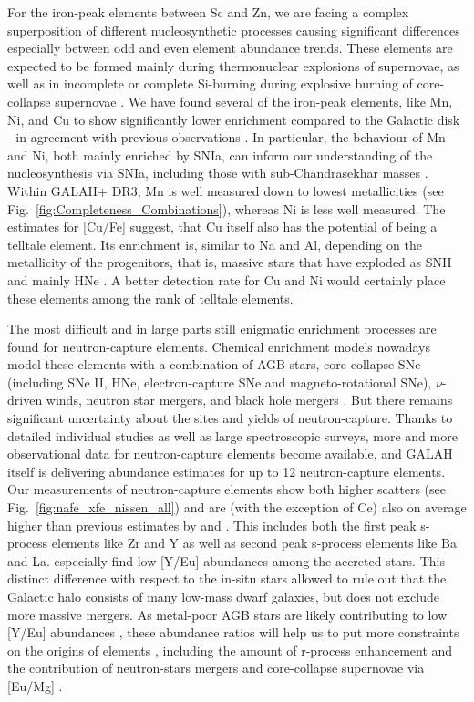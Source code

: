 \documentclass[fleqn,usenatbib]{mnras}
\begin{document}
For the iron-peak elements between Sc and Zn, we are facing a complex superposition of different nucleosynthetic processes causing significant differences especially between odd and even element abundance trends. These elements are expected to be formed mainly during thermonuclear explosions of supernovae, as well as in incomplete or complete Si-burning during explosive burning of core-collapse supernovae \citep{Kobayashi2020}. We have found several of the iron-peak elements, like Mn, Ni, and Cu to show significantly lower enrichment compared to the Galactic disk - in agreement with previous observations \citep{Nissen2010, Nissen2011, Hawkins2015, Hayes2018}. In particular, the behaviour of Mn and Ni, both mainly enriched by SNIa, can inform our understanding of the nucleosynthesis via SNIa, including those with sub-Chandrasekhar masses \citep{Sanders2021}. Within GALAH+ DR3, Mn is well measured down to lowest metallicities (see Fig.~\ref{fig:Completeness_Combinations}), whereas Ni is less well measured. The estimates for [Cu/Fe] suggest, that Cu itself also has the potential of being a telltale element. Its enrichment is, similar to Na and Al, depending on the metallicity of the progenitors, that is, massive stars that have exploded as SNII and mainly HNe \citep{Kobayashi2020}. A better detection rate for Cu and Ni would certainly place these elements among the rank of telltale elements.

The most difficult and in large parts still enigmatic enrichment processes are found for neutron-capture elements. Chemical enrichment models nowadays model these elements with a combination of AGB stars, core-collapse SNe (including SNe II, HNe, electron-capture SNe and magneto-rotational SNe), $\nu$-driven winds, neutron star mergers, and black hole mergers \citep[see][and references therein]{Kobayashi2020}. But there remains significant uncertainty about the sites and yields of neutron-capture. Thanks to detailed individual studies as well as large spectroscopic surveys, more and more observational data for neutron-capture elements become available, and GALAH itself is delivering abundance estimates for up to 12 neutron-capture elements. Our measurements of neutron-capture elements show both higher scatters (see Fig.~\ref{fig:nafe_xfe_nissen_all}) and are (with the exception of Ce) also on average higher than previous estimates by \citet{Nissen2011} and \citet{Fishlock2017}. This includes both the first peak s-process elements like Zr and Y as well as second peak s-process elements like Ba and La. \citet{Fishlock2017} especially find low [Y/Eu] abundances among the accreted stars. This distinct difference with respect to the in-situ stars allowed \citet{Venn2004} to rule out that the Galactic halo consists of many low-mass dwarf galaxies, but does not exclude more massive mergers. As metal-poor AGB stars are likely contributing to low [Y/Eu] abundances \citep{Venn2004}, these abundance ratios will help us to put more constraints on the origins of elements \citep[see also][]{Recio-Blanco2021}, including the amount of r-process enhancement \citep{Aguado2021} and the contribution of neutron-stars mergers and core-collapse supernovae via [Eu/Mg] \citep{Matsuno2021}.
\end{document}
